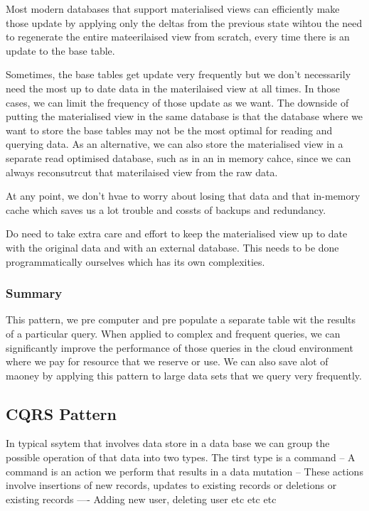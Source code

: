 \documentclass[a4paper, 11pt]{book}
\begin{document}
    Most modern databases that support materialised views can efficiently make those update by applying only the deltas from the previous state wihtou the need to regenerate the entire mateerilaised view from scratch, every time there is an update to the base table.

    Sometimes, the base tables get update very frequently but we don't necessarily need the most up to date data in the materilaised view at all times.
    In those cases, we can limit the frequency of those update as we want.
    The downside of putting the materialised view in the same database is that the database where we want to store the base tables may not be the most optimal for reading and querying data.
    As an alternative, we can also store the materialised view in a separate read optimised database, such as in an in memory cahce, since we can always reconsutrcut that materilaised view from the raw data.

    At any point, we don't hvae to worry about losing that data and that in-memory cache which saves us a lot trouble and cossts of backups and redundancy.

    Do need to take extra care and effort to keep the materialised view up to date with the original data and with an external database.
    This needs to be done programmatically ourselves which has its own complexities.

    \subsubsection{Summary}
    This pattern, we pre computer and pre populate a separate table wit the results of a particular query.
    When applied to complex and frequent queries, we can significantly improve the performance of those queries in the cloud environment where we pay for resource that we reserve or use.
    We can also save alot of maoney by applying this pattern to large data sets that we query very frequently.

    \subsection{CQRS Pattern}
    In typical ssytem that involves data store in a data base we can group the possible operation of that data into two types.
    The tirst type is a command
    -- A command is an action we perform that results in a data mutation
    -- These actions involve insertions of new records, updates to existing records or deletions or existing records
    ---- Adding new user, deleting user etc etc etc
\end{document}
